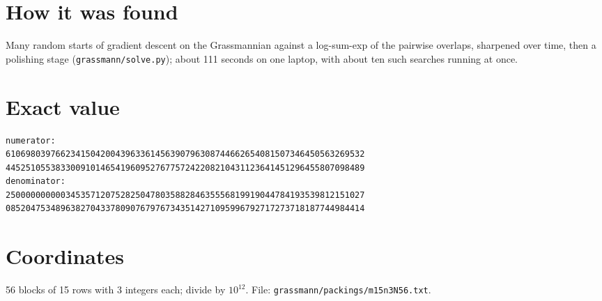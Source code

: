 \documentclass[11pt,a4paper]{article}
\begin{document}
\section{How it was found}
Many random starts of gradient descent on the Grassmannian against a log-sum-exp of the pairwise overlaps, sharpened over time, then a polishing stage (\texttt{grassmann/solve.py}); about 111 seconds on one laptop, with about ten such searches running at once.


\appendix
\section{Exact value}
{\small
\begin{verbatim}
numerator:
610698039766234150420043963361456390796308744662654081507346450563269532
445251055383300910146541960952767757242208210431123641451296455807098489
denominator:
250000000000345357120752825047803588284635556819919044784193539812151027
085204753489638270433780907679767343514271095996792717273718187744984414
\end{verbatim}}

\section{Coordinates}
56 blocks of 15 rows with 3 integers each; divide by $10^{12}$. File: \texttt{grassmann/packings/m15n3N56.txt}.
{\tiny
\begin{multicols}{3}
\end{multicols}}
\end{document}

